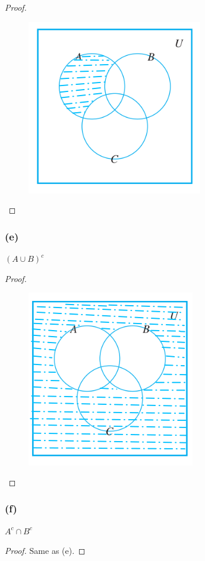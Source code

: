 \documentclass[14pt]{extarticle}
\begin{document}
\begin{proof}
\begin{figure}[ht!]
\centering
\includegraphics[scale=0.4]{../images/6.1.17.d.png}
\end{figure}
\end{proof}

\subsubsection{(e)}
$(A \cup B)^c$

\begin{proof}
\begin{figure}[ht!]
\centering
\includegraphics[scale=0.4]{../images/6.1.17.e.png}
\end{figure}
\end{proof}

\subsubsection{(f)}
$A^c \cap B^c$

\begin{proof}
Same as (e).
\end{proof}
\end{document}
